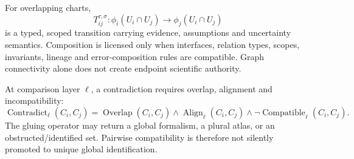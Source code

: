 For overlapping charts,
\begin{equation}T_{ij}^{\tau,\sigma}:\phi_i(U_i\cap U_j)\rightarrow\phi_j(U_i\cap U_j)\end{equation}
is a typed, scoped transition carrying evidence, assumptions and uncertainty semantics. Composition is licensed only when interfaces, relation types, scopes, invariants, lineage and error-composition rules are compatible. Graph connectivity alone does not create endpoint scientific authority.

At comparison layer $\ell$, a contradiction requires overlap, alignment and incompatibility:
\begin{equation}\operatorname{Contradict}_{\ell}(C_i,C_j)=\operatorname{Overlap}(C_i,C_j)\land\operatorname{Align}_{\ell}(C_i,C_j)\land\neg\operatorname{Compatible}_{\ell}(C_i,C_j).\end{equation}
The gluing operator may return a global formalism, a plural atlas, or an obstructed/identified set. Pairwise compatibility is therefore not silently promoted to unique global identification.

